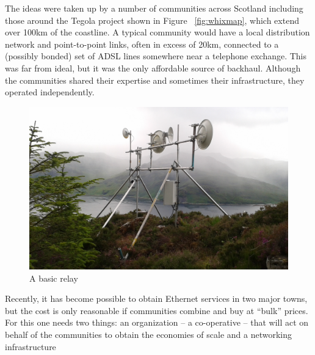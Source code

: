 The ideas were taken up by a number of communities across Scotland
including those around the Tegola project shown in Figure
~\ref{fig:whixmap}, which extend over 100km of the coastline. A
typical community would have a local distribution network and
point-to-point links, often in excess of 20km, connected to a
(possibly bonded) set of ADSL lines somewhere near a telephone
exchange. This was far from ideal, but it was the only affordable
source of backhaul. Although the communities shared their expertise
and sometimes their infrastructure, they operated independently.

\begin{figure}[h]
\centering
 \includegraphics[width=\columnwidth]{figs/mhialairigh-from-behind}
 \caption{A basic relay}
\label{fig:mhialairigh}
\end{figure}

Recently, it has become possible to obtain Ethernet services in two
major towns, but the cost is only reasonable if communities combine
and buy at ``bulk'' prices.  For this one needs two things: an
organization -- a co-operative -- that will act on behalf of the
communities to obtain the economies of scale and a networking
infrastructure

